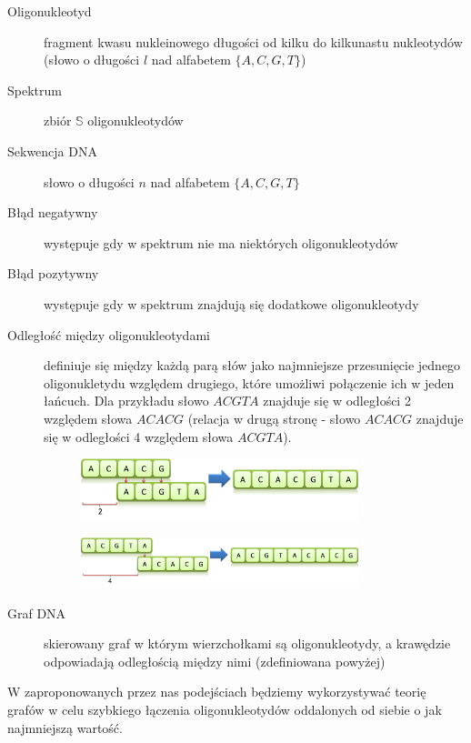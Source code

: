 \documentclass[a4paper,10pt]{article}
\begin{document}
\begin{description}
  \item[Oligonukleotyd] fragment kwasu nukleinowego długości od kilku do kilkunastu nukleotydów (słowo o długości $l$ nad alfabetem $\{A, C, G, T\}$)
  \item[Spektrum] zbiór $\mathbb{S}$ oligonukleotydów
  \item[Sekwencja DNA] słowo o długości $n$ nad alfabetem $\{A, C, G, T\}$
  \item[Błąd negatywny] występuje gdy w spektrum nie ma niektórych oligonukleotydów
  \item[Błąd pozytywny] występuje gdy w spektrum znajdują się dodatkowe oligonukleotydy
  \item[Odległość między oligonukleotydami] definiuje się między każdą parą słów jako najmniejsze przesunięcie jednego oligonukletydu
                                            względem drugiego, które umożliwi połączenie ich w jeden łańcuch. Dla przykładu słowo $ACGTA$
                                            znajduje się w odległości 2 względem słowa $ACACG$ (relacja w drugą stronę - słowo $ACACG$ 
                                            znajduje się w odległości 4 względem słowa $ACGTA$).

  \begin{figure}[h]
    \footnotesize\centering
    \includegraphics[width=0.8\textwidth,keepaspectratio]{Distance1.png}
  \end{figure}

  \begin{figure}[h]
    \footnotesize\centering
    \includegraphics[width=0.8\textwidth,keepaspectratio]{Distance2.png}
  \end{figure}
  \item[Graf DNA] skierowany graf w którym wierzchołkami są oligonukleotydy, a krawędzie odpowiadają odległością między nimi (zdefiniowana powyżej)
\end{description}

W zaproponowanych przez nas podejściach będziemy wykorzystywać teorię grafów w celu szybkiego łączenia oligonukleotydów oddalonych od siebie o jak najmniejszą wartość.
\end{document}
